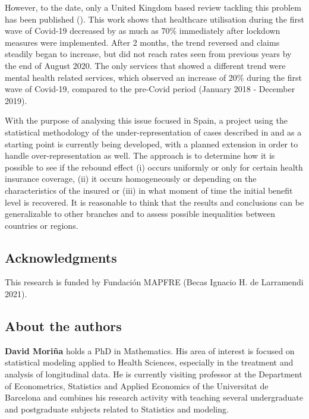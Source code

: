 \documentclass[main.tex]{subfiles}
\begin{document}
However, to the date, only a United Kingdom based review tackling this problem has been published (\cite{howarth_trends_2021}). This work shows that healthcare utilisation during the first wave of Covid-19 decreased by as much as 70\% immediately after lockdown measures were implemented. After 2 months, the trend reversed and claims steadily began to increase, but did not reach rates seen from previous years by the end of August 2020. The only services that showed a different trend were mental health related services, which observed an increase of 20\% during the first wave of Covid-19, compared to the pre-Covid period (January 2018 - December 2019).

With the purpose of analysing this issue focused in Spain, a project using the statistical methodology of the
under-representation of cases described in \cite{fernandez-fontelo_applying_2017} and \cite{fernandezfontelo_untangling_2019} as a starting point is currently being developed, with a planned extension in order to handle over-representation as well. The approach is to determine how it is possible to see if the rebound effect (i) occurs uniformly or only for certain health insurance coverage, (ii) it occurs homogeneously or
depending on the characteristics of the insured or (iii) in what moment of time the initial
benefit level is recovered. It is reasonable to think that the results and conclusions can be
generalizable to other branches and to assess possible inequalities between countries or
regions.

\subsection*{Acknowledgments}
This research is funded by Fundaci\'on MAPFRE (Becas Ignacio H. de Larramendi 2021).


\subsection*{About the authors}
\noindent\textbf{David Mori\~na }holds a PhD in Mathematics. His area of interest is focused on statistical modeling applied to Health Sciences, especially in the treatment and analysis of longitudinal data. He is currently visiting professor at the Department of Econometrics, Statistics and Applied Economics of the Universitat de Barcelona and combines his research activity with teaching several undergraduate and postgraduate subjects related to Statistics and modeling.



\vspace{0.5cm}





\printbibliography[title={References}]
\end{document}

